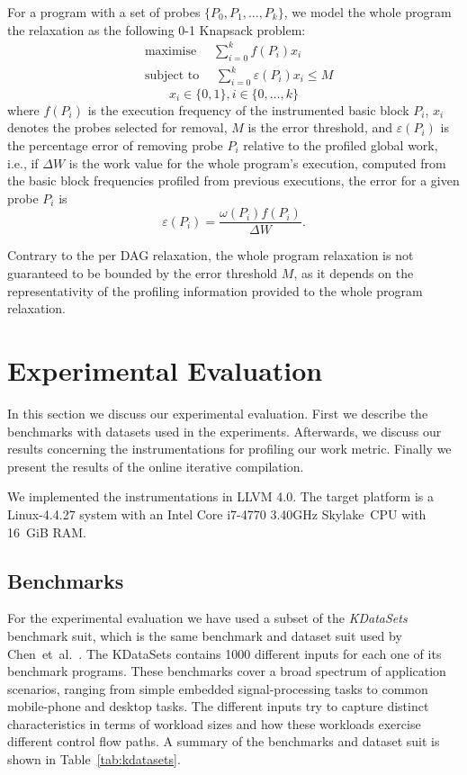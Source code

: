 \documentclass[sigplan,10pt]{acmart}
\theoremstyle{definition}
\newcommand{\etal}{et~al.}
\newcommand{\itercomp}{{iterative compilation}}
\begin{document}
For a program with a set of probes $\{P_0, P_1, \ldots, P_k\}$, we model the whole program the relaxation as the following 0-1 Knapsack problem:
\begin{equation*}
\begin{aligned}
& \textrm{maximise }\quad \sum_{i=0}^{k} f(P_i)x_i \\
& \textrm{subject to }\quad \sum_{i=0}^{k} \varepsilon(P_i)x_i \leq M
\end{aligned}
\end{equation*}
\[
x_i\in\{0,1\}, i\in\{0,\ldots,k\}
\]
where $f(P_i)$ is the execution frequency of the instrumented basic block $P_i$, $x_i$ denotes the probes selected for removal, $M$ is the error threshold, and $\varepsilon(P_i)$ is the percentage error of removing probe $P_i$ relative to the profiled global work, i.e.,
if $\Delta W$ is the work value for the whole program's execution, computed from the basic block frequencies profiled from previous executions, the error for a given probe $P_i$ is
\[
\varepsilon(P_i) = \frac{\omega(P_i)f(P_i)}{\Delta W}.
\]

Contrary to the per DAG relaxation, the whole program relaxation is not guaranteed to be bounded by the error threshold $M$,
as it depends on the representativity %
 of the profiling information provided to the whole program relaxation.
 

\section{Experimental Evaluation}

In this section we discuss our experimental evaluation.
First we describe the benchmarks with datasets used in the experiments.
Afterwards, we discuss our results concerning the instrumentations for profiling our work metric.
Finally we present the results of the online {\itercomp}.

We implemented the instrumentations in LLVM 4.0.
The target platform is a Linux-4.4.27 system with an Intel Core i7-4770 3.40GHz Skylake~CPU with 16~GiB RAM.

\subsection{Benchmarks}

For the experimental evaluation we have used a subset of the \textit{KDataSets} benchmark suit, which is the same benchmark and dataset suit used by Chen~\etal~\cite{chen10,chen12a}.
The KDataSets contains 1000 different inputs for each one of its benchmark programs.
These benchmarks cover a broad spectrum of application scenarios, ranging from simple embedded signal-processing tasks to common mobile-phone and desktop tasks.
The different inputs try to capture distinct characteristics in terms of workload sizes and how these workloads exercise different control flow paths.
A summary of the benchmarks and dataset suit is shown in Table~\ref{tab:kdatasets}.
\end{document}
